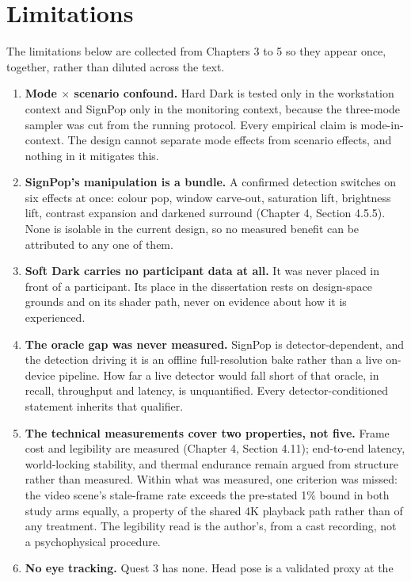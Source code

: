 \section{Limitations}

The limitations below are collected from Chapters 3 to 5 so they appear once, together, rather than
diluted across the text.

\begin{enumerate}
\item \textbf{Mode $\times$ scenario confound.} Hard Dark is tested only in the workstation context
  and SignPop only in the monitoring context, because the three-mode sampler was cut from the running
  protocol. Every empirical claim is mode-in-context. The design cannot separate mode effects from
  scenario effects, and nothing in it mitigates this.
\item \textbf{SignPop's manipulation is a bundle.} A confirmed detection switches on six effects at
  once: colour pop, window carve-out, saturation lift, brightness lift, contrast expansion and
  darkened surround (Chapter 4, Section 4.5.5). None is isolable in the current design, so no
  measured benefit can be attributed to any one of them.
\item \textbf{Soft Dark carries no participant data at all.} It was never placed in front of a
  participant. Its place in the dissertation rests on design-space grounds and on its shader path,
  never on evidence about how it is experienced.
\item \textbf{The oracle gap was never measured.} SignPop is detector-dependent, and the detection
  driving it is an offline full-resolution bake rather than a live on-device pipeline. How far a live
  detector would fall short of that oracle, in recall, throughput and latency, is unquantified. Every
  detector-conditioned statement inherits that qualifier.
\item \textbf{The technical measurements cover two properties, not five.} Frame cost and legibility
  are measured (Chapter 4, Section 4.11); end-to-end latency, world-locking stability, and thermal
  endurance remain argued from structure rather than measured. Within what was measured, one
  criterion was missed: the video scene's stale-frame rate exceeds the pre-stated 1\% bound in both
  study arms equally, a property of the shared 4K playback path rather than of any treatment. The
  legibility read is the author's, from a cast recording, not a psychophysical procedure.
\item \textbf{No eye tracking.} Quest 3 has none. Head pose is a validated proxy at the

\end{enumerate}
